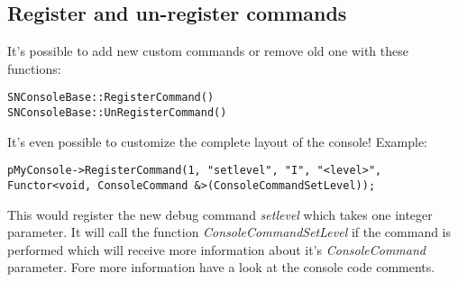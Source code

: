 \subsection{Register and un-register commands}
It's possible to add new custom commands or remove old one with these functions:

\begin{lstlisting}[caption=Register and un-register commands]
SNConsoleBase::RegisterCommand()
SNConsoleBase::UnRegisterCommand()
\end{lstlisting}

It's even possible to customize the complete layout of the console! Example:

\begin{lstlisting}[caption=Register command]
pMyConsole->RegisterCommand(1, "setlevel", "I", "<level>", Functor<void, ConsoleCommand &>(ConsoleCommandSetLevel));
\end{lstlisting}

This would register the new debug command \emph{setlevel} which takes one integer parameter. It will call the function \emph{ConsoleCommandSetLevel} if the command is performed which will receive more information about it's \emph{ConsoleCommand} parameter. Fore more information have a look at the console code comments.
